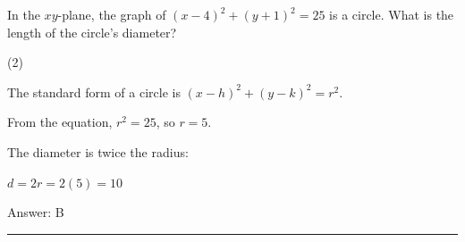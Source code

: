 \documentclass[11pt,paper=a4,answers]{exam}
\begin{document}
\begin{questions}
\vspace{1cm}

\question
In the $xy$-plane, the graph of $(x - 4)^2 + (y + 1)^2 = 25$ is a circle. What is the length of the circle's diameter?
\begin{tasks}(2)
\end{tasks}

\begin{solution}
The standard form of a circle is $(x - h)^2 + (y - k)^2 = r^2$.
\vspace{5pt}
\begin{center}
From the equation, $r^2 = 25$, so $r = 5$.
\end{center}
\vspace{5pt}
The diameter is twice the radius:
\vspace{5pt}
\begin{center}
$d = 2r = 2(5) = 10$
\end{center}
\vspace{5pt}
Answer: \colorbox{yellow!100}{B}
\end{solution}


\end{questions}
\begin{center}
\rule{.5\textwidth}{1pt}
\end{center}
\end{document}

